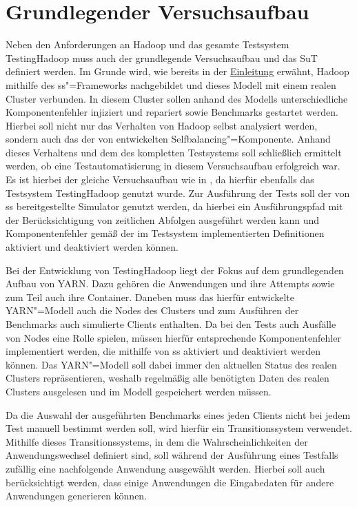 \section{Grundlegender Versuchsaufbau}
\label{sec:clusterSetup}

Neben den Anforderungen an Hadoop und das gesamte Testsystem TestingHadoop muss auch der grundlegende Versuchsaufbau und das \gls{SuT} definiert werden.
Im Grunde wird, wie bereits in der \hyperref[ch:intro]{Einleitung} erwähnt, Hadoop mithilfe des \gls{ss}"=Frameworks nachgebildet und dieses Modell mit einem realen Cluster verbunden.
In diesem Cluster sollen anhand des Modells unterschiedliche Komponentenfehler injiziert und repariert sowie Benchmarks gestartet werden.
Hierbei soll nicht nur das Verhalten von Hadoop selbst analysiert werden, sondern auch das der von \citeauthor{Zhang2016} entwickelten Selfbalancing"=Komponente.
Anhand dieses Verhaltens und dem des kompletten Testsystems soll schließlich ermittelt werden, ob eine Testautomatisierung in diesem Versuchsaufbau erfolgreich war.
Es ist hierbei der gleiche Versuchsaufbau wie in \cite{Eberhardinger2018}, da hierfür ebenfalls das Testsystem TestingHadoop genutzt wurde.
Zur Ausführung der Tests soll der von \gls{ss} bereitgestellte Simulator genutzt werden, da hierbei ein Ausführungspfad mit der Berücksichtigung von zeitlichen Abfolgen ausgeführt werden kann und Komponentenfehler gemäß der im Testsystem implementierten Definitionen aktiviert und deaktiviert werden können.

Bei der Entwicklung von TestingHadoop liegt der Fokus auf dem grundlegenden Aufbau von YARN.
Dazu gehören die Anwendungen und ihre Attempts sowie zum Teil auch ihre Container.
Daneben muss das hierfür entwickelte YARN"=Modell auch die Nodes des Clusters und zum Ausführen der Benchmarks auch simulierte Clients enthalten.
Da bei den Tests auch Ausfälle von Nodes eine Rolle spielen, müssen hierfür entsprechende Komponentenfehler implementiert werden, die mithilfe von \gls{ss} aktiviert und deaktiviert werden können.
Das YARN"=Modell soll dabei immer den aktuellen Status des realen Clusters repräsentieren, weshalb regelmäßig alle benötigten Daten des realen Clusters ausgelesen und im Modell gespeichert werden müssen.

Da die Auswahl der ausgeführten Benchmarks eines jeden Clients nicht bei jedem Test manuell bestimmt werden soll, wird hierfür ein Transitionssystem verwendet.
Mithilfe dieses Transitionssystems, in dem die Wahrscheinlichkeiten der Anwendungswechsel definiert sind, soll während der Ausführung eines Testfalls zufällig eine nachfolgende Anwendung ausgewählt werden.
Hierbei soll auch berücksichtigt werden, dass einige Anwendungen die Eingabedaten für andere Anwendungen generieren können.

